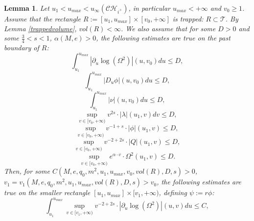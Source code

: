 \documentclass[10pt,a4paper]{article}
\theoremstyle{plain}
\newtheorem{lem}[thm]{Lemma}
\theoremstyle{remark}
\theoremstyle{definition}
\theoremstyle{plain}
\theoremstyle{remark}
\theoremstyle{definition}
\newcommand{\uu}{u_{max}}
\newcommand{\CH}{\mathcal{CH}_{i^+}}
\numberwithin{equation}{section}
\begin{document}
\begin{lem} \label{finitevolumeestlemma2} Let $u_1 < \uu < u_{\infty}(\CH)$,  in particular $\uu <+\infty$ and $v_0\geq 1$. Assume that the rectangle $R:= [u_1,\uu] \times [v_0,+\infty]$ is trapped: $R \subset \mathcal{T}$. By Lemma \ref{trappedvolume}, $vol(R)<\infty$. We also assume that for some $D>0$ and some $\frac{3}{4}<s<1$, $\alpha(M,e)>0$, the following estimates are true on the past boundary of $R$:  \begin{equation} \label{dulogomegaL12hyp}
	\int_{u_1}^{u_{max}}|\partial_u \log(\Omega^2)|(u,v_0)du  \leq D,
	\end{equation} 	\begin{equation} \label{duphiL12hyp}
	\int_{u_1}^{u_{max}} |D_u \phi|(u,v_0)du \leq D,
	\end{equation} 	\begin{equation} \label{durL12hyp}
	\int_{u_1}^{u_{max}} |\nu|(u,v_0)du  \leq D,
	\end{equation} 	\begin{equation} \label{dvrL12hyp}
	\sup_{v \in  [v_0,+\infty)} v^{2s} \cdot |\lambda|(u_1,v) dv \leq D,
	\end{equation} 	\begin{equation} \label{phiLinfty2hyp}
	\sup_{v \in  [v_0,+\infty)} v^{-1+s} \cdot|\phi|(u_1,v) \leq D,
	\end{equation}  	\begin{equation} \label{QLinfty2hyp}
	\sup_{v \in  [v_0,+\infty)} v^{-2+2s} \cdot |Q|(u_1,v) \leq D,
	\end{equation} \begin{equation} \label{OmegaLinfty2hyp}
	\sup_{v \in  [v_0,+\infty)} e^{\alpha \cdot v} \cdot \Omega^2(u_1,v) \leq D.
	\end{equation} %
	Then, for some $C(M,e,q_0,m^2,u_1,\uu,v_0,vol(R),D,s)>0$, $v_1=v_1(M,e,q_0,m^2,u_1,\uu,vol(R),D,s)>v_0$, the following estimates are true on the smaller rectangle $[u_1,\uu] \times [v_1,+\infty)$, defining $\psi:=r\phi$: \begin{equation} \label{dulogomegaL12}
	\int_{u_1}^{\uu}\sup_{v \in [v_1,+\infty)} v^{-2+2s} \cdot |\partial_u \log(\Omega^2)|(u,v)du  \leq C,
	\end{equation} 	\begin{equation} \label{dupsiL12}

\end{equation}
\end{lem}
\end{document}

